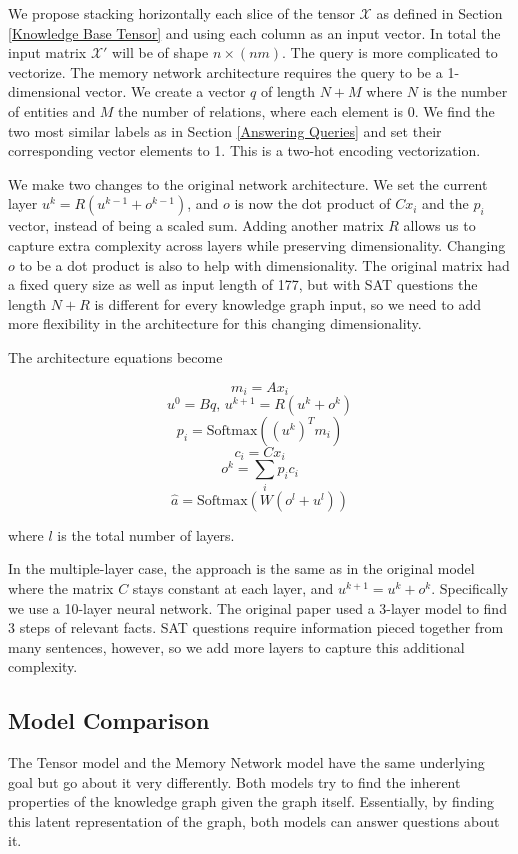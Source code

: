 \documentclass[pageno]{final_paper}
\begin{document}
We propose stacking horizontally each slice of the tensor $\mathcal{X}$ as
defined in Section \ref{Knowledge Base Tensor} and using each column as an input
vector. In total the input matrix $\mathcal{X}'$ will be of shape $n\times
(nm)$. The query is more complicated to vectorize. The memory network
architecture requires the query to be a 1-dimensional vector. We create a vector
$q$ of length $N+M$ where $N$ is the number of entities and $M$ the number of
relations, where each element is 0. We find the two most similar labels as in
Section \ref{Answering Queries} and set their corresponding vector elements to
1. This is a two-hot encoding vectorization.

We make two changes to the original network architecture. We set the current
layer $u^k = R(u^{k-1} + o^{k-1})$, and $o$ is now the dot product of $Cx_i$ and
the $p_i$ vector, instead of being a scaled sum. Adding another matrix $R$
allows us to capture extra complexity across layers while preserving
dimensionality. Changing $o$ to be a dot product is also to help with
dimensionality. The original matrix had a fixed query size as well as input
length of 177, but with SAT questions the length $N+R$ is different for every
knowledge graph input, so we need to add more flexibility in the architecture
for this changing dimensionality.

The architecture equations become

$$m_i = Ax_i$$
$$u^0 = Bq,\, u^{k+1} = R(u^k + o^k)$$
$$p_i = \text{Softmax}\left(\left(u^k\right)^Tm_i\right)$$
$$c_i = Cx_i$$
$$o^k = \sum_i p_ic_i$$
$$\hat{a} = \text{Softmax}\left(W\left(o^l+u^l\right)\right)$$

where $l$ is the total number of layers.

In the multiple-layer case, the approach is the same as in the original model
where the matrix $C$ stays constant at each layer, and $u^{k+1} = u^k + o^k$.
Specifically we use a 10-layer neural network. The original paper used a 3-layer
model to find 3 steps of relevant facts. SAT questions require information
pieced together from many sentences, however, so we add more layers to capture
this additional complexity.

\subsection{Model Comparison}
\label{Model Comparison}

The Tensor model and the Memory Network model have the same underlying goal but
go about it very differently. Both models try to find the inherent properties
of the knowledge graph given the graph itself. Essentially, by finding this
latent representation of the graph, both models can answer questions about it.
\end{document}
